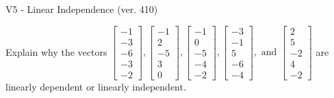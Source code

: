 \begin{exercise}
  \begin{exerciseTitle}V5 - Linear Independence (ver. 410)\end{exerciseTitle}
  \begin{exerciseStatement}
    Explain why the vectors \(\left[\begin{array}{r}
-1 \\
-3 \\
-6 \\
-3 \\
-2
\end{array}\right] , \left[\begin{array}{r}
-1 \\
2 \\
-5 \\
3 \\
0
\end{array}\right] , \left[\begin{array}{r}
-1 \\
0 \\
-5 \\
-4 \\
-2
\end{array}\right] , \left[\begin{array}{r}
-3 \\
-1 \\
5 \\
-6 \\
-4
\end{array}\right] , \text{ and } \left[\begin{array}{r}
2 \\
5 \\
-2 \\
4 \\
-2
\end{array}\right]\) are linearly dependent or linearly independent.	



\end{exerciseStatement}
\end{exercise}

